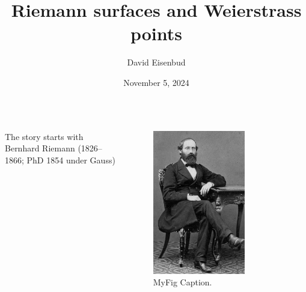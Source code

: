 \documentclass[12pt, aspectratio=169]{beamer}
\title{Riemann surfaces and Weierstrass points}
\author{David Eisenbud}
\date{November 5, 2024}
\begin{document}
\maketitle


\begin{frame}{}
\begin{columns}
 The story starts with Bernhard Riemann (1826--1866; PhD 1854 under Gauss)
\begin{figure}
    \centering
    \includegraphics[width=0.7\textwidth]{"Bernhard-Riemann.jpg"}
    \caption{\label{fig:Riemann}MyFig Caption.}
\end{figure}
\end{columns}
 \end{frame}
\end{document}
